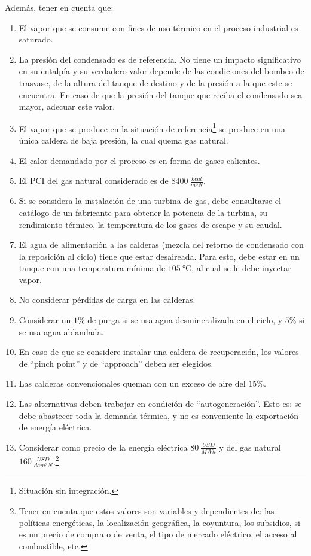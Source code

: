 Además, tener en cuenta que:
\begin{enumerate}
    \item El vapor que se consume con fines de uso térmico en el proceso industrial es saturado.
    \item La presión del condensado es de referencia. No tiene un impacto significativo en su entalpía y su verdadero valor depende de las condiciones del bombeo de trasvase, de la altura del tanque de destino y de la presión a la que este se encuentra. En caso de que la presión del tanque que reciba el condensado sea mayor, adecuar este valor.
    \item El vapor que se produce en la situación de referencia\footnote{Situación sin integración.} se produce en una única caldera de baja presión, la cual quema gas natural.
    \item El calor demandado por el proceso es en forma de gases calientes.
    \item El PCI del gas natural considerado es de $\SI{8400}{\frac{kcal}{m^3N}}$.
    \item Si se considera la instalación de una turbina de gas, debe consultarse el catálogo de un fabricante para obtener la potencia de la turbina, su rendimiento térmico, la temperatura de los gases de escape y su caudal.
    \item El agua de alimentación a las calderas (mezcla del retorno de condensado con la reposición al ciclo) tiene que estar desaireada. Para esto, debe estar en un tanque con una temperatura mínima de $\SI{105}{\celsius}$, al cual se le debe inyectar vapor.
    \item No considerar pérdidas de carga en las calderas.
    \item Considerar un $1\%$ de purga si se usa agua desmineralizada en el ciclo, y $5\%$ si se usa agua ablandada.
    \item En caso de que se considere instalar una caldera de recuperación, los valores de ``pinch point'' y de ``approach'' deben ser elegidos.
    \item Las calderas convencionales queman con un exceso de aire del $15\%$.
    \item Las alternativas deben trabajar en condición de ``autogeneración''. Esto es: se debe abastecer toda la demanda térmica, y no es conveniente la exportación de energía eléctrica.
    \item Considerar como precio de la energía eléctrica $\SI{80}{\frac{USD}{MWh}}$ y del gas natural $\SI{160}{\frac{USD}{dam^3N}}$.\footnote{Tener en cuenta que estos valores son variables y dependientes de: las políticas energéticas, la localización geográfica, la coyuntura, los subsidios, si es un precio de compra o de venta, el tipo de mercado eléctrico, el acceso al combustible, etc.}

\end{enumerate}

